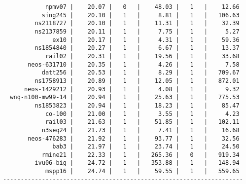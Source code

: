 \begin{verbatim}
            npmv07 |    20.07 |   0   |    48.03 |   1   |    12.66
           sing245 |    20.10 |   1   |     8.81 |   1   |   106.63
         ns2118727 |    20.10 |   1   |    11.31 |   1   |    32.39
         ns2137859 |    20.11 |   1   |     7.75 |   1   |     5.27
              ex10 |    20.17 |   1   |     4.31 |   1   |    59.36
         ns1854840 |    20.27 |   1   |     6.67 |   1   |    13.37
            rail02 |    20.31 |   1   |    19.56 |   1   |    33.68
       neos-631710 |    20.35 |   1   |     4.26 |   1   |     7.58
           datt256 |    20.53 |   1   |     8.29 |   1   |   709.67
         ns1758913 |    20.89 |   1   |    12.05 |   1   |   872.01
      neos-1429212 |    20.93 |   1   |     4.08 |   1   |     9.32
  wnq-n100-mw99-14 |    20.94 |   1   |    25.63 |   1   |   775.53
         ns1853823 |    20.94 |   1   |    18.23 |   1   |    85.47
            co-100 |    21.00 |   1   |     3.55 |   1   |     4.23
            rail03 |    21.63 |   1   |    51.85 |   1   |   102.11
           n3seq24 |    21.73 |   1   |     7.41 |   1   |    16.68
       neos-476283 |    21.92 |   1   |    93.77 |   1   |    32.56
              bab3 |    21.97 |   1   |    23.74 |   1   |    24.50
           rmine21 |    22.33 |   1   |   265.36 |   0   |   919.34
         ivu06-big |    24.72 |   1   |   353.88 |   1   |   148.94
            mspp16 |    24.74 |   1   |    59.55 |   1   |   559.65
--------------------------------------------------------------------
\end{verbatim}
    
